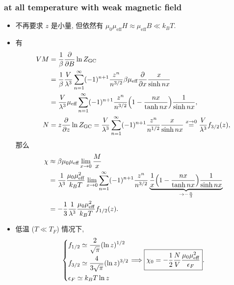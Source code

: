 \subsubsection{at all temperature with weak magnetic field}
\begin{itemize}
	\item 不再要求 $z$ 是小量, 但依然有 $\mu_0 \mu_\text{eff} H \approx \mu_\text{eff} B \ll k_B T$.
	
	\item 有
	\begin{align}
		V M &= \frac{1}{\beta} \frac{\partial}{\partial B} \ln Z_\text{GC} \notag \\
		&= \frac{1}{\beta} \frac{V}{\lambda^3} \sum_{n = 1}^\infty (- 1)^{n + 1} \frac{z^n}{n^{3 / 2}} \beta \mu_\text{eff} \frac{\partial}{\partial x} \frac{x}{\sinh n x} \notag \\
		&= \frac{V}{\lambda^3} \mu_\text{eff} \sum_{n = 1}^\infty (- 1)^{n + 1} \frac{z^n}{n^{3 / 2}} \Big( 1 - \frac{n x}{\tanh n x} \Big) \frac{1}{\sinh n x}, \\
		N &= z \frac{\partial}{\partial z} \ln Z_\text{GC} = \frac{V}{\lambda^3} \sum_{n = 1}^\infty (- 1)^{n + 1} \frac{z^n}{n^{1 / 2}} \frac{x}{\sinh n x} \overset{x \rightarrow 0}{=} \frac{V}{\lambda^3} f_{3 / 2}(z),
	\end{align}
	那么
	\begin{align}
		\chi &\approx \beta \mu_0 \mu_\text{eff} \lim_{x \rightarrow 0} \frac{M}{x} \notag \\
		&= \frac{1}{\lambda^3} \frac{\mu_0 \mu_\text{eff}^2}{k_B T} \lim_{x \rightarrow 0} \sum_{n = 1}^\infty (- 1)^{n + 1} \frac{z^n}{n^{3 / 2}} \underbrace{\frac{1}{x} \Big( 1 - \frac{n x}{\tanh n x} \Big) \frac{1}{\sinh n x}}_{\rightarrow - \frac{n}{3}} \notag \\
		&= - \frac{1}{3} \frac{1}{\lambda^3} \frac{\mu_0 \mu_\text{eff}^2}{k_B T} f_{1 / 2}(z).
	\end{align}
	
	\item 低温 ($T \ll T_F$) 情况下,
	\begin{equation}
		\begin{dcases}
			f_{1 / 2} \simeq \frac{2}{\sqrt{\pi}} (\ln z)^{1 / 2} \\
			f_{3 / 2} \simeq \frac{4}{3 \sqrt{\pi}} (\ln z)^{3 / 2} \\
			\epsilon_F \simeq k_B T \ln z
		\end{dcases} \Longrightarrow \boxed{\chi_0 = - \frac{1}{2} \frac{N}{V} \frac{\mu_0 \mu_\text{eff}^2}{\epsilon_F}}.
	\end{equation}
\end{itemize}

